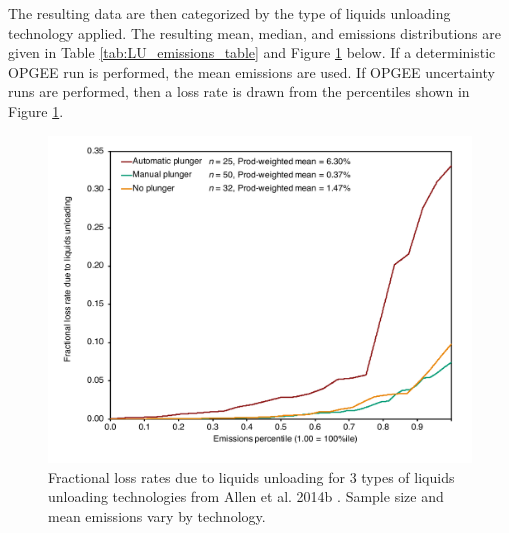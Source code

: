\documentclass[11pt]{report}
\begin{document}
{{{{The resulting data are then categorized by the type of liquids unloading technology applied. The resulting mean, median, and emissions distributions are given in Table \ref{tab:LU_emissions_table} and Figure \ref{fig:Liquids_Unloading} below. If a deterministic OPGEE run is performed, the mean emissions are used. If OPGEE uncertainty runs are performed, then a loss rate is drawn from the percentiles shown in Figure \ref{fig:Liquids_Unloading}.

\begin{figure}[]
\includegraphics[width=0.8\columnwidth]{images/Liquids_Unloading.pdf}
\caption{Fractional loss rates due to liquids unloading for 3 types of liquids unloading technologies from Allen et al. 2014b \cite{Allen2014b}. Sample size and mean emissions vary by technology.}
\label{fig:Liquids_Unloading}
\end{figure}


}}}}
\end{document}
